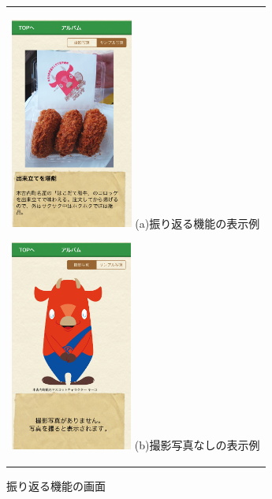 \begin{figure}[htbp]
  \begin{center}
    \begin{tabular}{c}
    
      \begin{minipage}{0.33\hsize}
        \begin{center}
\includegraphics[width=4cm, bb=0 0 304 570]{album2.png}
          \hspace{1cm} %
          {\footnotesize (a)振り返る機能の表示例}
        \end{center}
      \end{minipage}
      
      \begin{minipage}{0.33\hsize}
        \begin{center}
\includegraphics[width=4cm, bb=0 0 304 570]{album1.png}
          \hspace{1cm} %
          {\footnotesize (b)撮影写真なしの表示例}
        \end{center}
      \end{minipage}

    \end{tabular}
    \caption{振り返る機能の画面}
    \label{fig:lena}
  \end{center}
\end{figure}　

